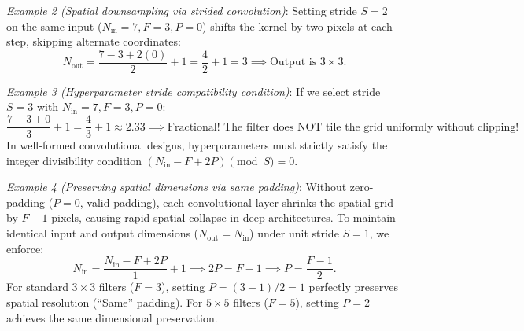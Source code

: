 \noindent\textit{Example 2 (Spatial downsampling via strided convolution)}: Setting stride $S = 2$ on the same input ($N_{\text{in}} = 7, F = 3, P = 0$) shifts the kernel by two pixels at each step, skipping alternate coordinates:
\begin{equation}
N_{\text{out}} = \frac{7 - 3 + 2(0)}{2} + 1 = \frac{4}{2} + 1 = 3 \implies \text{Output is } 3 \times 3.
\end{equation}

\noindent\textit{Example 3 (Hyperparameter stride compatibility condition)}: If we select stride $S = 3$ with $N_{\text{in}} = 7, F = 3, P = 0$:
\begin{equation}
\frac{7 - 3 + 0}{3} + 1 = \frac{4}{3} + 1 \approx 2.33 \implies \text{Fractional! The filter does NOT tile the grid uniformly without clipping!}
\end{equation}
In well-formed convolutional designs, hyperparameters must strictly satisfy the integer divisibility condition $(N_{\text{in}} - F + 2P) \pmod S = 0$.

\noindent\textit{Example 4 (Preserving spatial dimensions via same padding)}: Without zero-padding ($P = 0$, valid padding), each convolutional layer shrinks the spatial grid by $F - 1$ pixels, causing rapid spatial collapse in deep architectures. To maintain identical input and output dimensions ($N_{\text{out}} = N_{\text{in}}$) under unit stride $S = 1$, we enforce:
\begin{equation}
N_{\text{in}} = \frac{N_{\text{in}} - F + 2P}{1} + 1 \implies 2P = F - 1 \implies P = \frac{F - 1}{2}.
\label{eq:same_padding_formula}
\end{equation}
For standard $3 \times 3$ filters ($F = 3$), setting $P = (3-1)/2 = 1$ perfectly preserves spatial resolution (``Same'' padding). For $5 \times 5$ filters ($F = 5$), setting $P = 2$ achieves the same dimensional preservation.

